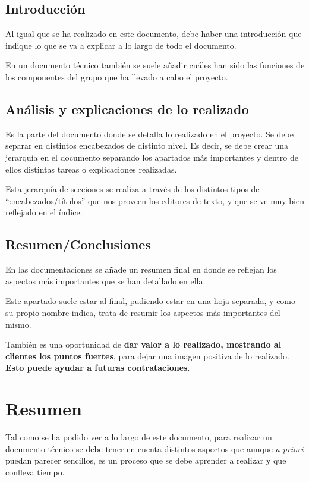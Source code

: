 \section{Introducción}
Al igual que se ha realizado en este documento, debe haber una introducción que indique lo que se va a explicar a lo largo de todo el documento.

En un documento técnico también se suele añadir cuáles han sido las funciones de los componentes del grupo que ha llevado a cabo el proyecto.

\section{Análisis y explicaciones de lo realizado}
Es la parte del documento donde se detalla lo realizado en el proyecto. Se debe separar en distintos encabezados de distinto nivel. Es decir, se debe crear una jerarquía en el documento separando los apartados más importantes y dentro de ellos distintas tareas o explicaciones realizadas.

Esta jerarquía de secciones se realiza a través de los distintos tipos de “encabezados/títulos” que nos proveen los editores de texto, y que se ve muy bien reflejado en el índice.



\section{Resumen/Conclusiones}
En las documentaciones se añade un resumen final en donde se reflejan los aspectos más importantes que se han detallado en ella.

Este apartado suele estar al final, pudiendo estar en una hoja separada, y como su propio nombre indica, trata de resumir los aspectos más importantes del mismo.

También es una oportunidad de \textbf{dar valor a lo realizado, mostrando al clientes los puntos fuertes}, para dejar una imagen positiva de lo realizado. \textbf{Esto puede ayudar a futuras contrataciones}.





\chapter{Resumen}

Tal como se ha podido ver a lo largo de este documento, para realizar un documento técnico se debe tener en cuenta distintos aspectos que aunque \textit{a priori} puedan parecer sencillos, es un proceso que se debe aprender a realizar y que conlleva tiempo.


